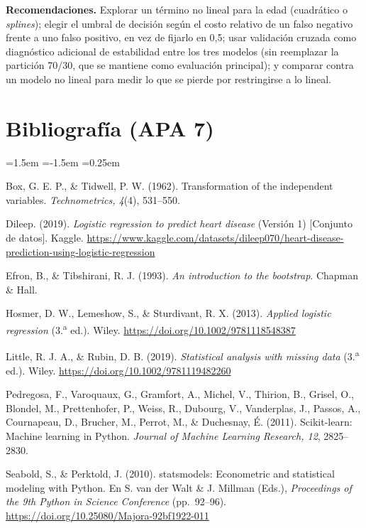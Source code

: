 \documentclass[11pt,a4paper]{article}
\begin{document}
\textbf{Recomendaciones.} Explorar un término no lineal para la edad (cuadrático o \emph{splines}); elegir el umbral de decisión según el costo relativo de un falso negativo frente a uno falso positivo, en vez de fijarlo en 0,5; usar validación cruzada como diagnóstico adicional de estabilidad entre los tres modelos (sin reemplazar la partición 70/30, que se mantiene como evaluación principal); y comparar contra un modelo no lineal para medir lo que se pierde por restringirse a lo lineal.

\section*{Bibliografía (APA 7)}
\begin{list}{}{\leftmargin=1.5em \itemindent=-1.5em \itemsep=0.25em \parsep=0pt}\small\raggedright
\item Box, G. E. P., \& Tidwell, P. W. (1962). Transformation of the independent variables. \textit{Technometrics, 4}(4), 531--550.
\item Dileep. (2019). \textit{Logistic regression to predict heart disease} (Versión 1) [Conjunto de datos]. Kaggle. \url{https://www.kaggle.com/datasets/dileep070/heart-disease-prediction-using-logistic-regression}
\item Efron, B., \& Tibshirani, R. J. (1993). \textit{An introduction to the bootstrap}. Chapman \& Hall.
\item Hosmer, D. W., Lemeshow, S., \& Sturdivant, R. X. (2013). \textit{Applied logistic regression} (3.\textsuperscript{a} ed.). Wiley. \url{https://doi.org/10.1002/9781118548387}
\item Little, R. J. A., \& Rubin, D. B. (2019). \textit{Statistical analysis with missing data} (3.\textsuperscript{a} ed.). Wiley. \url{https://doi.org/10.1002/9781119482260}
\item Pedregosa, F., Varoquaux, G., Gramfort, A., Michel, V., Thirion, B., Grisel, O., Blondel, M., Prettenhofer, P., Weiss, R., Dubourg, V., Vanderplas, J., Passos, A., Cournapeau, D., Brucher, M., Perrot, M., \& Duchesnay, É. (2011). Scikit-learn: Machine learning in Python. \textit{Journal of Machine Learning Research, 12}, 2825--2830.
\item Seabold, S., \& Perktold, J. (2010). statsmodels: Econometric and statistical modeling with Python. En S. van der Walt \& J. Millman (Eds.), \textit{Proceedings of the 9th Python in Science Conference} (pp.~92--96). \url{https://doi.org/10.25080/Majora-92bf1922-011}
\end{list}
\end{document}
